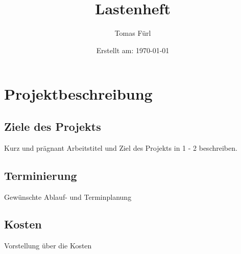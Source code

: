 \documentclass[a4paper, 12pt]{article}
\title{Lastenheft \Projektname}
\date{Erstellt am: \today}
\author{Tomas Fürl}
\begin{document}
    \maketitle
    \newpage

    \section{Projektbeschreibung}
    \subsection{Ziele des Projekts}
    Kurz und prägnant Arbeitstitel und Ziel des Projekts in 1 - 2 beschreiben.
    \subsection{Terminierung}
    Gewünschte Ablauf- und Terminplanung
    \subsection{Kosten}
    Vorstellung über die Kosten
\end{document}
